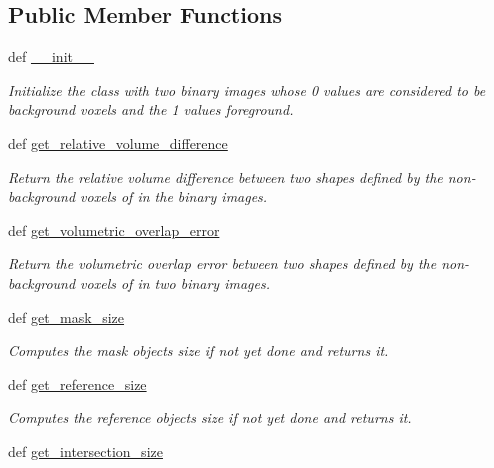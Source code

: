 \subsection*{Public Member Functions}
\begin{DoxyCompactItemize}
\item 
def \hyperlink{classmedpy_1_1metric_1_1volume_1_1Volume_ad5c463235786414fc4ff2b2157995722}{\_\-\_\-init\_\-\_\-}
\begin{DoxyCompactList}\small\item\em Initialize the class with two binary images whose 0 values are considered to be background voxels and the 1 values foreground. \end{DoxyCompactList}\item 
def \hyperlink{classmedpy_1_1metric_1_1volume_1_1Volume_a7aa74dbef135230a14cfd4395faef16c}{get\_\-relative\_\-volume\_\-difference}
\begin{DoxyCompactList}\small\item\em Return the relative volume difference between two shapes defined by the non-\/background voxels of in the binary images. \end{DoxyCompactList}\item 
def \hyperlink{classmedpy_1_1metric_1_1volume_1_1Volume_a742f8e8c275f27aae19a0b5a7c7f9946}{get\_\-volumetric\_\-overlap\_\-error}
\begin{DoxyCompactList}\small\item\em Return the volumetric overlap error between two shapes defined by the non-\/background voxels of in two binary images. \end{DoxyCompactList}\item 
def \hyperlink{classmedpy_1_1metric_1_1volume_1_1Volume_a70fe2aa96e50c1f61404b9c9988111cf}{get\_\-mask\_\-size}
\begin{DoxyCompactList}\small\item\em Computes the mask objects size if not yet done and returns it. \end{DoxyCompactList}\item 
def \hyperlink{classmedpy_1_1metric_1_1volume_1_1Volume_a99cbdf7c5a6ce732c6007a163f48f3fb}{get\_\-reference\_\-size}
\begin{DoxyCompactList}\small\item\em Computes the reference objects size if not yet done and returns it. \end{DoxyCompactList}\item 
def \hyperlink{classmedpy_1_1metric_1_1volume_1_1Volume_af1eacc2b4badc09ecb2e73b7d38b7356}{get\_\-intersection\_\-size}

\end{DoxyCompactItemize}
